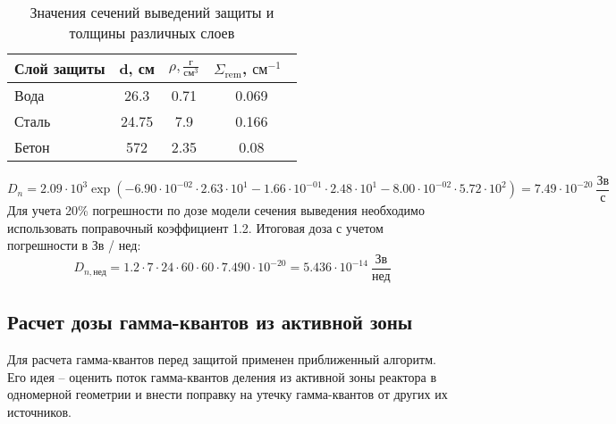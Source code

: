 \begin{table}[H]
	\caption{Значения сечений выведений защиты и толщины различных слоев \cite{ТвэлТерновых}}
	\begin{center}
        \begin{tabular}{|l|c|c|c|}
        \toprule
         Слой защиты & d, см & $\rho, \frac{\text{г}}{\text{см}^3}$ & $\Sigma_{\text{rem}}$, $\text{см}^{-1}$\ \\
         \midrule
         \hline
         Вода & 26.3 & 0.71 & 0.069 \\
         \hline
         Сталь & 24.75 & 7.9 & 0.166 \\
         \hline
         Бетон & 572 & 2.35 & 0.08 \\
         \bottomrule
		\end{tabular}
		\label{tabular:bio_sec_2_in}
	\end{center}
\end{table}
$$
        D_n = 2.09 \cdot 10^{{ 3 }} \exp\left( 
                -6.90 \cdot 10^{{ -02 }}\cdot2.63 \cdot 10^{{ 1 }}
                -1.66 \cdot 10^{{ -01 }}\cdot2.48 \cdot 10^{{ 1 }}
                -8.00 \cdot 10^{{ -02 }}\cdot5.72 \cdot 10^{{ 2 }}
        \right) = 7.49 \cdot 10^{{ -20 }}\ \frac{\text{Зв}}{\text{с}}
$$
\noindent Для учета 20\% погрешности по дозе модели сечения выведения необходимо использовать поправочный коэффициент 1.2. Итоговая доза с учетом погрешности в Зв / нед:
$$
        D_{n, \text{нед}} = 1.2 \cdot 7 \cdot 24 \cdot 60 \cdot 60 \cdot 7.490 \cdot 10^{{ -20 }} = 5.436 \cdot 10^{{ -14 }}\ \frac{\text{Зв}}{\text{нед}}
$$


\subsection{Расчет дозы гамма-квантов из активной зоны}
Для расчета гамма-квантов перед защитой применен приближенный алгоритм. Его идея – оценить поток гамма-квантов деления из активной зоны реактора в одномерной геометрии и внести поправку на утечку гамма-квантов от других их источников.

